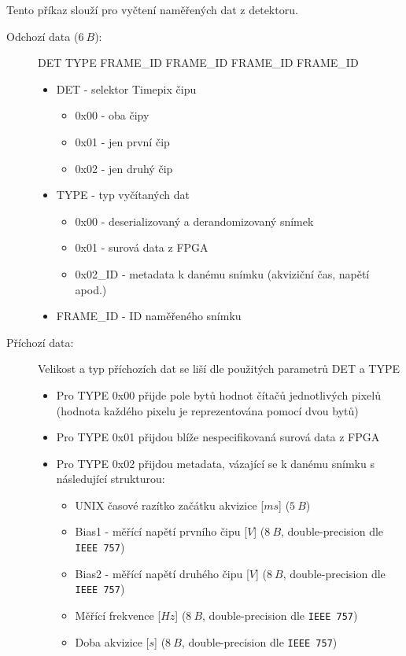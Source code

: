 \begin{description}
		Tento příkaz slouží pro vyčtení naměřených dat z detektoru.
		\begin{description}
			\item[Odchozí data ($6~B$):] DET TYPE FRAME\_ID FRAME\_ID FRAME\_ID FRAME\_ID
				\begin{itemize}
					\item DET - selektor Timepix čipu
						\begin{itemize}
							\item 0x00 - oba čipy
							\item 0x01 - jen první čip
							\item 0x02 - jen druhý čip
						\end{itemize}
					\item TYPE - typ vyčítaných dat
						\begin{itemize}
							\item 0x00 - deserializovaný a derandomizovaný snímek
							\item 0x01 - surová data z FPGA
							\item 0x02\_ID - metadata k danému snímku (akviziční čas, napětí apod.)
						\end{itemize}
					\item FRAME\_ID - ID naměřeného snímku
				\end{itemize}
			\item[Příchozí data:] Velikost a typ příchozích dat se liší dle použitých parametrů DET a TYPE
				\begin{itemize}
					\item Pro TYPE 0x00 přijde pole bytů hodnot čítačů jednotlivých pixelů (hodnota každého pixelu je reprezentována pomocí dvou bytů)
					\item Pro TYPE 0x01 přijdou blíže nespecifikovaná surová data z FPGA
					\item Pro TYPE 0x02 přijdou metadata, vázající se k danému snímku s následující strukturou:
						\begin{itemize}
							\item UNIX časové razítko začátku akvizice [$ms$] ($5~B$)
							\item Bias1 - měřící napětí prvního čipu [$V$] ($8~B$, double-precision dle \texttt{IEEE 757})
							\item Bias2 - měřící napětí druhého čipu [$V$] ($8~B$, double-precision dle \texttt{IEEE 757})
							\item Měřící frekvence [$Hz$] ($8~B$, double-precision dle \texttt{IEEE 757})
							\item Doba akvizice [$s$] ($8~B$, double-precision dle \texttt{IEEE 757})
						\end{itemize}	


\end{itemize}
\end{description}
\end{description}
